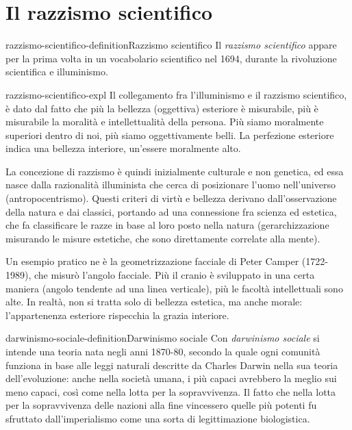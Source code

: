 \documentclass[preview]{standalone}
\begin{document}
\section{Il razzismo scientifico}

\begin{snippetdefinition}{razzismo-scientifico-definition}{Razzismo scientifico}
    Il \textit{razzismo scientifico} appare per la prima volta in un vocabolario scientifico nel 1694,
    durante la rivoluzione scientifica e illuminismo.
\end{snippetdefinition}

\begin{snippet}{razzismo-scientifico-expl}
    Il collegamento fra l'illuminismo e il razzismo scientifico, è dato dal fatto che più
    la bellezza (oggettiva) esteriore è misurabile, più è misurabile la moralità e intellettualità della persona.
    Più siamo moralmente superiori dentro di noi, più siamo oggettivamente belli.
    La perfezione esteriore indica una bellezza interiore, un'essere moralmente alto.
    
    La concezione di razzismo è quindi inizialmente culturale e non genetica,
    ed essa nasce dalla razionalità illuminista che cerca di posizionare l'uomo nell'universo (antropocentrismo).
    Questi criteri di virtù e bellezza derivano dall'osservazione della natura e dai classici,
    portando ad una connessione fra scienza ed estetica, che fa classificare le razze
    in base al loro posto nella natura (gerarchizzazione misurando le misure estetiche, che
    sono direttamente correlate alla mente).
    
    Un esempio pratico ne è la geometrizzazione facciale di Peter Camper (1722-1989),
    che misurò l'angolo facciale. Più il cranio è sviluppato in una certa maniera (angolo tendente ad una linea verticale),
    più le facoltà intellettuali sono alte. In realtà, non si
    tratta solo di bellezza estetica, ma anche morale: l'appartenenza esteriore rispecchia
    la grazia interiore.
\end{snippet}

\begin{snippetdefinition}{darwinismo-sociale-definition}{Darwinismo sociale}
    Con \textit{darwinismo sociale} si intende una teoria nata negli anni 1870-80, secondo la quale ogni comunità
    funziona in base alle leggi naturali descritte da Charles Darwin nella sua teoria
    dell'evoluzione: anche nella società umana, i più capaci avrebbero la meglio sui meno
    capaci, così come nella lotta per la sopravvivenza. Il fatto che nella lotta per la sopravvivenza
    delle nazioni alla fine vincessero quelle più potenti fu sfruttato dall'imperialismo come una
    sorta di legittimazione biologistica.
\end{snippetdefinition}
\end{document}
